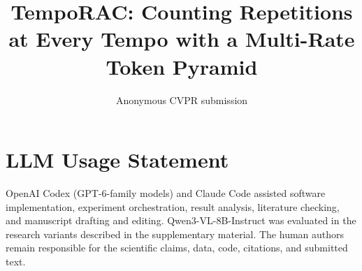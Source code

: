 \documentclass[10pt,twocolumn,letterpaper]{article}
\title{TempoRAC: Counting Repetitions at Every Tempo with a Multi-Rate Token Pyramid}
\author{Anonymous CVPR submission}
\begin{document}
\maketitle










\section*{LLM Usage Statement}
OpenAI Codex (GPT-6-family models) and Claude Code assisted software implementation,
experiment orchestration, result analysis, literature checking, and manuscript
drafting and editing. Qwen3-VL-8B-Instruct was evaluated in the research variants
described in the supplementary material. The human authors remain responsible
for the scientific claims, data, code, citations, and submitted text.
{
    \small
    
    
}
\end{document}

